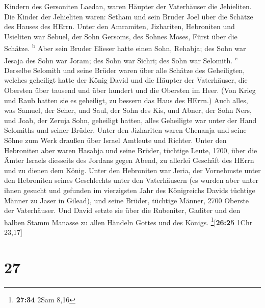 Kindern des Gersoniten Laedan, waren Häupter der Vaterhäuser die
Jehieliten.  Die Kinder der Jehieliten waren: Setham und
sein Bruder Joel über die Schätze des Hauses des HErrn. 
Unter den Amramiten, Jizhariten, Hebroniten und Usieliten
 war Sebuel, der Sohn Gersoms, des Sohnes Moses, Fürst
über die Schätze. \textsuperscript{b}  Aber sein Bruder
Elieser hatte einen Sohn, Rehabja; des Sohn war Jesaja des Sohn war
Joram; des Sohn war Sichri; des Sohn war Selomith. \textsuperscript{c}
 Derselbe Selomith und seine Brüder waren über alle
Schätze des Geheiligten, welches geheiligt hatte der König David und die
Häupter der Vaterhäuser, die Obersten über tausend und über hundert und
die Obersten im Heer.  (Von Krieg und Raub hatten sie es
geheiligt, zu bessern das Haus des HErrn.)  Auch alles,
was Samuel, der Seher, und Saul, der Sohn des Kis, und Abner, der Sohn
Ners, und Joab, der Zeruja Sohn, geheiligt hatten, alles Geheiligte war
unter der Hand Selomiths und seiner Brüder.  Unter den
Jizhariten waren Chenanja und seine Söhne zum Werk draußen über Israel
Amtleute und Richter.  Unter den Hebroniten aber waren
Hasabja und seine Brüder, tüchtige Leute, 1700, über die Ämter Israels
diesseits des Jordans gegen Abend, zu allerlei Geschäft des HErrn und zu
dienen dem König.  Unter den Hebroniten war Jeria, der
Vornehmste unter den Hebroniten seines Geschlechts unter den
Vaterhäusern (es wurden aber unter ihnen gesucht und gefunden im
vierzigsten Jahr des Königreichs Davids tüchtige Männer zu Jaser in
Gilead),  und seine Brüder, tüchtige Männer, 2700 Oberste
der Vaterhäuser. Und David setzte sie über die Rubeniter, Gaditer und
den halben Stamm Manasse zu allen Händeln Gottes und des Königs.
\footnote{\textbf{27:34} 2Sam 8,16}{[}\textbf{26:25} 1Chr 23,17{]}

\hypertarget{section-26}{%
\section{27}\label{section-26}}


